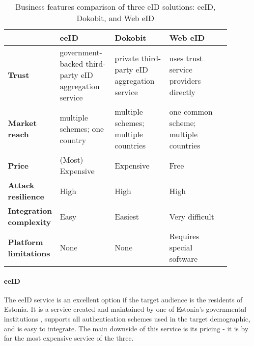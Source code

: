 \begin{table}
    \centering
    \begin{tabular}{ p{0.15\linewidth} | >{\raggedright}p{0.25\linewidth} | >{\raggedright}p{0.25\linewidth} | >{\raggedright}p{0.25\linewidth} p{0px}}
                                        & \textbf{eeID}                                         & \textbf{Dokobit}                            & \textbf{Web eID}                      & \\
        \hline
        \textbf{Trust}                  & government-backed third-party eID aggregation service & private third-party eID aggregation service & uses trust service providers directly & \\
        \hline
        \textbf{Market reach}           & multiple schemes; one country                         & multiple schemes; multiple countries        & one common scheme; multiple countries & \\
        \hline
        \textbf{Price}                  & (Most) Expensive                                      & Expensive                                   & Free                                  & \\
        \hline
        \textbf{Attack resilience}      & High                                                  & High                                        & High                                  & \\
        \hline
        \textbf{Integration complexity} & Easy                                                  & Easiest                                     & Very difficult                        & \\
        \hline
        \textbf{Platform limitations}   & None                                                  & None                                        & Requires special software             & \\
    \end{tabular}
    \caption{Business features comparison of three eID solutions: eeID, Dokobit, and Web eID}
    \label{tbl:summary-comparison-business}
\end{table}

\paragraph{eeID}

The eeID service is an excellent option if the target audience is the residents of Estonia. It is a service created and maintained by one of Estonia's governmental institutions \cite{eeid-governmental}, supports all authentication schemes used in the target demographic, and is easy to integrate. The main downside of this service is its pricing - it is by far the most expensive service of the three.

